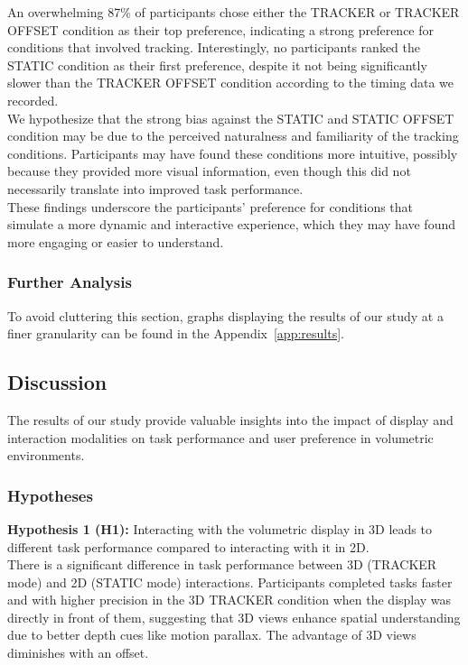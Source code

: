 An overwhelming 87\% of participants chose either the TRACKER or TRACKER OFFSET condition as their top preference, indicating a strong preference for conditions that involved tracking. Interestingly, no participants ranked the STATIC condition as their first preference, despite it not being significantly slower than the TRACKER OFFSET condition according to the timing data we recorded. \\

We hypothesize that the strong bias against the STATIC and STATIC OFFSET condition may be due to the perceived naturalness and familiarity of the tracking conditions. Participants may have found these conditions more intuitive, possibly because they provided more visual information, even though this did not necessarily translate into improved task performance. \\

These findings underscore the participants' preference for conditions that simulate a more dynamic and interactive experience, which they may have found more engaging or easier to understand.

\subsubsection{Further Analysis}
To avoid cluttering this section, graphs displaying the results of our study at a finer granularity can be found in the Appendix~\ref{app:results}. \\

\subsection{Discussion}

The results of our study provide valuable insights into the impact of display and interaction modalities on task performance and user preference in volumetric environments.

\subsubsection{Hypotheses}

\textbf{Hypothesis 1 (H1):} Interacting with the volumetric display in 3D leads to different task performance compared to interacting with it in 2D. \\

There is a significant difference in task performance between 3D (TRACKER mode) and 2D (STATIC mode) interactions. Participants completed tasks faster and with higher precision in the 3D TRACKER condition when the display was directly in front of them, suggesting that 3D views enhance spatial understanding due to better depth cues like motion parallax. The advantage of 3D views diminishes with an offset.\\

